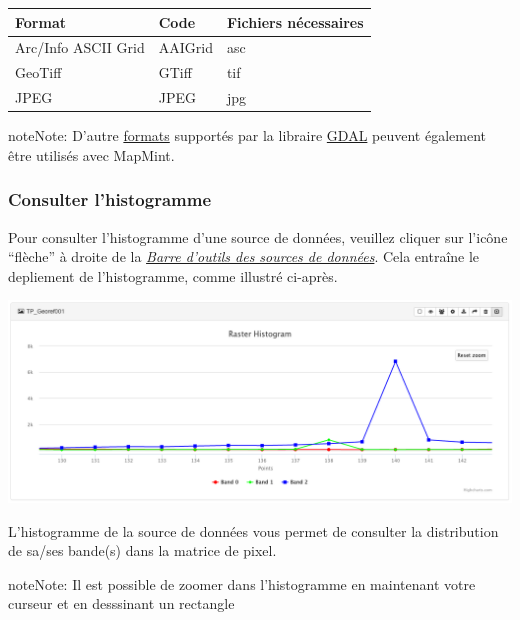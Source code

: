 \documentclass[letterpaper,10pt,french]{sphinxmanual}
\begin{document}
\begin{tabulary}{\linewidth}{|L|L|L|}
\hline

\textbf{Format}
 & 
\textbf{Code}
 & 
\textbf{Fichiers nécessaires}
\\
\hline
Arc/Info ASCII Grid
 & 
AAIGrid
 & 
asc
\\
\hline
GeoTiff
 & 
GTiff
 & 
tif
\\
\hline
JPEG
 & 
JPEG
 & 
jpg
\\
\hline\end{tabulary}


\begin{notice}{note}{Note:}
D'autre \href{http://www.gdal.org/formats\_list.html}{formats} supportés par la libraire \href{http://www.gdal.org}{GDAL} peuvent également être utilisés avec MapMint.
\end{notice}


\subsubsection{Consulter l'histogramme}
\label{data/datasources:consulter-l-histogramme}
Pour consulter l'histogramme d'une source de données, veuillez cliquer sur l'icône ``flèche'' à droite de la {\hyperref[data/datasources:datasource-table-label]{\emph{Barre d'outils des sources de données}}}. Cela entraîne le depliement de l'histogramme, comme illustré ci-après.

\includegraphics[width=1.000\linewidth]{view-datasource-histogram.png}

L'histogramme de la source de données vous permet de consulter la distribution de sa/ses bande(s) dans la matrice de pixel.

\begin{notice}{note}{Note:}
Il est possible de zoomer dans l'histogramme en maintenant votre curseur et en desssinant un rectangle
\end{notice}
\end{document}
